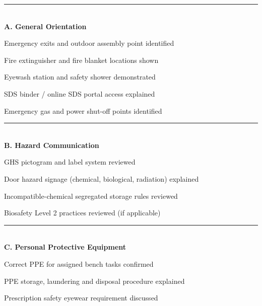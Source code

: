 \documentclass[10pt,a4paper]{article}
\newcommand{\subsecbar}[2]{%
  \vspace{2pt}
  {\color{labNavy}\rule{\linewidth}{0.55pt}}\\[1.5pt]
  {\small\bfseries\color{clinicalTeal} #1 \normalfont\color{slateGray}\footnotesize\; #2}\\[1pt]
}
\begin{document}
\vspace{4pt}

\noindent
\begin{minipage}[t]{0.485\linewidth}
\subsecbar{A. General Orientation}{}
\begin{checklist}
\item Emergency exits and outdoor assembly point identified
\item Fire extinguisher and fire blanket locations shown
\item Eyewash station and safety shower demonstrated
\item SDS binder / online SDS portal access explained
\item Emergency gas and power shut-off points identified
\end{checklist}

\subsecbar{B. Hazard Communication}{}
\begin{checklist}
\item GHS pictogram and label system reviewed
\item Door hazard signage (chemical, biological, radiation) explained
\item Incompatible-chemical segregated storage rules reviewed
\item Biosafety Level 2 practices reviewed (if applicable)
\end{checklist}

\subsecbar{C. Personal Protective Equipment}{}
\begin{checklist}
\item Correct PPE for assigned bench tasks confirmed
\item PPE storage, laundering and disposal procedure explained
\item Prescription safety eyewear requirement discussed
\end{checklist}
\end{minipage}%
\hfill
\end{document}
